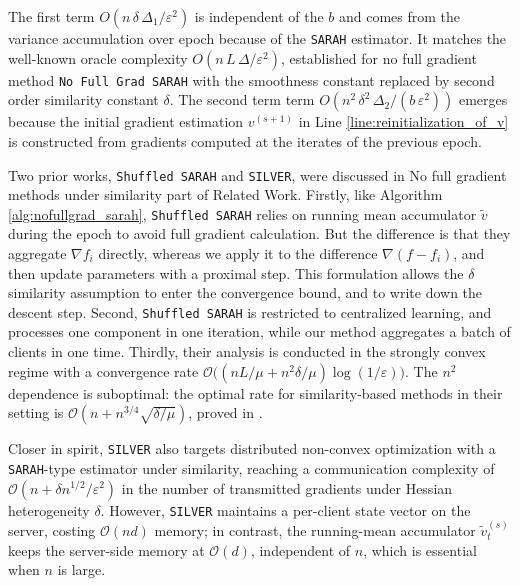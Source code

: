 \documentclass{article}
\newtheorem{lemma}{Lemma}
\begin{document}
The first term $O(n\,\delta\,\Delta_1/\varepsilon^2)$ is independent of the $b$ and comes from the variance accumulation over epoch because of the \texttt{SARAH} estimator. It matches the well-known oracle complexity $O(n\,L\,\Delta/\varepsilon^2)$, established for no full gradient method \texttt{No Full Grad SARAH} \cite{medyakov2025variance} with the smoothness constant replaced by second order similarity constant $\delta$. The second term 
term $O(n^2\,\delta^2\,\Delta_2/(b\,\varepsilon^2))$ emerges because the initial gradient estimation $v^{(s+1)}$ in Line \ref{line:reinitialization_of_v} is constructed from gradients computed at the iterates of the previous epoch. 

Two prior works, \texttt{Shuffled SARAH} and \texttt{SILVER},  were discussed in No full gradient methods under similarity part of Related Work. Firstly, like Algorithm \ref{alg:nofullgrad_sarah}, \texttt{Shuffled SARAH} relies on running mean accumulator $\tilde v$ during the epoch to avoid full gradient calculation. But the difference is that they aggregate $\nabla f_{i}$ directly, whereas we apply it to the difference $\nabla(f-f_i)$, and then update parameters with a proximal step. This formulation allows the $\delta$ similarity assumption to enter the convergence bound, and to write down the descent step. 
Second, \texttt{Shuffled SARAH} is restricted to centralized learning, and processes one component in one iteration, while our method aggregates a batch of clients in one time. Thirdly, their analysis is conducted in the strongly convex regime with a convergence rate $\mathcal{O}\bigl((nL/\mu + n^{2}\delta/\mu)\log(1/\varepsilon)\bigr)$. The $n^2$ dependence is suboptimal: the optimal rate for similarity-based methods in their setting is $\mathcal{O}(n + n^{3/4}\sqrt{\delta/\mu})$, proved in \cite{lin2023stochastic}. 

Closer in spirit, \texttt{SILVER} \cite{oko2024silver} also targets 
distributed non-convex optimization with a \texttt{SARAH}-type 
estimator under similarity, reaching a communication complexity of 
$\mathcal{O}(n + \delta n^{1/2}/\varepsilon^2)$ in the number of 
transmitted gradients under Hessian heterogeneity $\delta$. However, \texttt{SILVER} 
maintains a per-client state vector on the server, costing 
$\mathcal{O}(nd)$ memory; in contrast, the running-mean accumulator 
$\tilde v_t^{(s)}$ keeps the server-side memory at $\mathcal{O}(d)$, 
independent of $n$, which is essential when $n$ is large.

\end{document}
